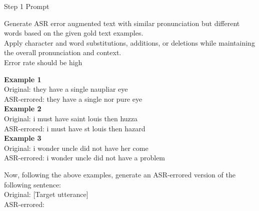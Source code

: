 
\begin{prompt}[colback=black!0!white, colframe=black!98!black]
{Step 1 Prompt}{\textcolor{myBlue}{Generate ASR error augmented text with similar pronunciation but different words based on the given gold text examples.}\\
Apply character and word substitutions, additions, or deletions while maintaining the overall pronunciation and context. \\
Error rate should be high 
\par            %
\noindent\dotfill\par 
\textbf{Example 1}\\
Original: they have a single naupliar eye  \\
ASR-errored: they have a single nor pure eye \\

\textbf{Example 2}\\
Original: i must have saint louis then huzza  \\
ASR-errored: i must have st louis then hazard \\

\textbf{Example 3}\\
Original: i wonder uncle did not have her come  \\
ASR-errored: i wonder uncle did not have a problem 
\par            %
\noindent\dotfill\par 
\textcolor{myBlue}{Now, following the above examples, generate an ASR-errored version of the following sentence:\\}
Original: \textcolor{myOrange}{[Target utterance]} \\
ASR-errored: 
}
\end{prompt}
